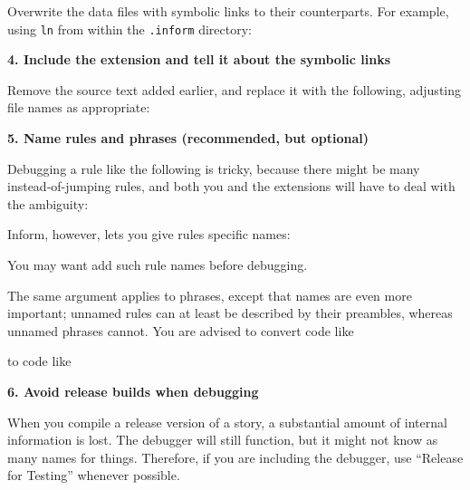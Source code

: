 \documentclass{book}
\newcommand{\lastpagebreak}{\vfill\pagebreak}
\begin{document}
Overwrite the data files with symbolic links to their counterparts.  For
example, using \texttt{ln} from within the \texttt{.inform} directory:

\begin{quote}
  
\end{quote}

\textbf{4. Include the extension and tell it about the symbolic links}

Remove the source text added earlier, and replace it with the following,
adjusting file names as appropriate:

\begin{quote}
  
\end{quote}

\lastpagebreak

\textbf{5. Name rules and phrases (recommended, but optional)}

Debugging a rule like the following is tricky, because there might be many
instead-of-jumping rules, and both you and the extensions will have to deal with
the ambiguity:

\begin{quote}
  
\end{quote}

Inform, however, lets you give rules specific names:

\begin{quote}
  
\end{quote}

You may want add such rule names before debugging.

The same argument applies to phrases, except that names are even more important;
unnamed rules can at least be described by their preambles, whereas unnamed
phrases cannot.  You are advised to convert code like

\begin{quote}
  
\end{quote}

to code like

\begin{quote}
  
\end{quote}

\textbf{6. Avoid release builds when debugging}

When you compile a release version of a story, a substantial amount of internal
information is lost.  The debugger will still function, but it might not know as
many names for things.  Therefore, if you are including the debugger, use
``Release for Testing'' whenever possible.
\end{document}
